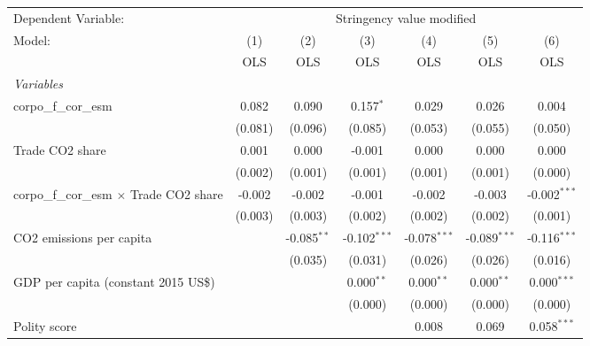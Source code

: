 
\begingroup
\centering
\begin{tabular}{lcccccc}
   \toprule
   Dependent Variable: & \multicolumn{6}{c}{Stringency value modified}\\
   Model:                                          & (1)     & (2)           & (3)            & (4)            & (5)            & (6)\\  
                                                   &  OLS    & OLS           & OLS            & OLS            & OLS            & OLS\\  
   \midrule
   \emph{Variables}\\
   corpo\_f\_cor\_esm                              & 0.082   & 0.090         & 0.157$^{*}$    & 0.029          & 0.026          & 0.004\\   
                                                   & (0.081) & (0.096)       & (0.085)        & (0.053)        & (0.055)        & (0.050)\\   
   Trade CO2 share                                 & 0.001   & 0.000         & -0.001         & 0.000          & 0.000          & 0.000\\   
                                                   & (0.002) & (0.001)       & (0.001)        & (0.001)        & (0.001)        & (0.000)\\   
   corpo\_f\_cor\_esm $\times$ Trade CO2 share     & -0.002  & -0.002        & -0.001         & -0.002         & -0.003         & -0.002$^{***}$\\   
                                                   & (0.003) & (0.003)       & (0.002)        & (0.002)        & (0.002)        & (0.001)\\   
   CO2 emissions per capita                        &         & -0.085$^{**}$ & -0.102$^{***}$ & -0.078$^{***}$ & -0.089$^{***}$ & -0.116$^{***}$\\   
                                                   &         & (0.035)       & (0.031)        & (0.026)        & (0.026)        & (0.016)\\   
   GDP per capita (constant 2015 US\$)             &         &               & 0.000$^{**}$   & 0.000$^{**}$   & 0.000$^{**}$   & 0.000$^{***}$\\   
                                                   &         &               & (0.000)        & (0.000)        & (0.000)        & (0.000)\\   
   Polity score                                    &         &               &                & 0.008          & 0.069          & 0.058$^{***}$\\   

\end{tabular}
